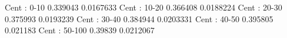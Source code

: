 Cent : 0-10
0.339043 0.0167633
Cent : 10-20
0.366408 0.0188224
Cent : 20-30
0.375993 0.0193239
Cent : 30-40
0.384944 0.0203331
Cent : 40-50
0.395805 0.021183
Cent : 50-100
0.39839 0.0212067

